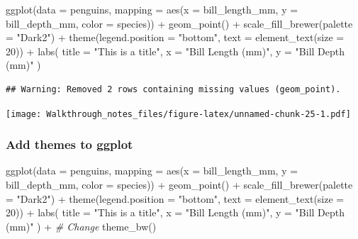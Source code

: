 \documentclass[
]{article}
\newenvironment{Shaded}{\begin{snugshade}}{\end{snugshade}}
\newcommand{\AttributeTok}[1]{\textcolor[rgb]{0.77,0.63,0.00}{#1}}
\newcommand{\CommentTok}[1]{\textcolor[rgb]{0.56,0.35,0.01}{\textit{#1}}}
\newcommand{\DecValTok}[1]{\textcolor[rgb]{0.00,0.00,0.81}{#1}}
\newcommand{\FunctionTok}[1]{\textcolor[rgb]{0.00,0.00,0.00}{#1}}
\newcommand{\NormalTok}[1]{#1}
\newcommand{\SpecialCharTok}[1]{\textcolor[rgb]{0.00,0.00,0.00}{#1}}
\newcommand{\StringTok}[1]{\textcolor[rgb]{0.31,0.60,0.02}{#1}}
\begin{document}
\begin{Shaded}
\begin{Highlighting}[]
\FunctionTok{ggplot}\NormalTok{(}\AttributeTok{data =}\NormalTok{ penguins, }
       \AttributeTok{mapping =} \FunctionTok{aes}\NormalTok{(}\AttributeTok{x =}\NormalTok{ bill\_length\_mm, }
                     \AttributeTok{y =}\NormalTok{ bill\_depth\_mm, }
                     \AttributeTok{color =}\NormalTok{ species)) }\SpecialCharTok{+} 
  \FunctionTok{geom\_point}\NormalTok{() }\SpecialCharTok{+} 
  \FunctionTok{scale\_fill\_brewer}\NormalTok{(}\AttributeTok{palette =} \StringTok{"Dark2"}\NormalTok{) }\SpecialCharTok{+} 
  \FunctionTok{theme}\NormalTok{(}\AttributeTok{legend.position =} \StringTok{"bottom"}\NormalTok{, }
        \AttributeTok{text =} \FunctionTok{element\_text}\NormalTok{(}\AttributeTok{size =} \DecValTok{20}\NormalTok{)) }\SpecialCharTok{+} 
  \FunctionTok{labs}\NormalTok{(}
    \AttributeTok{title =} \StringTok{"This is a title"}\NormalTok{, }
    \AttributeTok{x =} \StringTok{"Bill Length (mm)"}\NormalTok{, }
    \AttributeTok{y =} \StringTok{"Bill Depth (mm)"}
\NormalTok{  )}
\end{Highlighting}
\end{Shaded}

\begin{verbatim}
## Warning: Removed 2 rows containing missing values (geom_point).
\end{verbatim}

\texttt{[image: Walkthrough\_notes\_files/figure-latex/unnamed-chunk-25-1.pdf]}

\hypertarget{add-themes-to-ggplot}{%
\subsubsection{Add themes to ggplot}\label{add-themes-to-ggplot}}

\begin{Shaded}
\begin{Highlighting}[]
\FunctionTok{ggplot}\NormalTok{(}\AttributeTok{data =}\NormalTok{ penguins, }
       \AttributeTok{mapping =} \FunctionTok{aes}\NormalTok{(}\AttributeTok{x =}\NormalTok{ bill\_length\_mm, }
                     \AttributeTok{y =}\NormalTok{ bill\_depth\_mm, }
                     \AttributeTok{color =}\NormalTok{ species)) }\SpecialCharTok{+} 
  \FunctionTok{geom\_point}\NormalTok{() }\SpecialCharTok{+} 
  \FunctionTok{scale\_fill\_brewer}\NormalTok{(}\AttributeTok{palette =} \StringTok{"Dark2"}\NormalTok{) }\SpecialCharTok{+} 
  \FunctionTok{theme}\NormalTok{(}\AttributeTok{legend.position =} \StringTok{"bottom"}\NormalTok{, }
        \AttributeTok{text =} \FunctionTok{element\_text}\NormalTok{(}\AttributeTok{size =} \DecValTok{20}\NormalTok{)) }\SpecialCharTok{+} 
  \FunctionTok{labs}\NormalTok{(}
    \AttributeTok{title =} \StringTok{"This is a title"}\NormalTok{, }
    \AttributeTok{x =} \StringTok{"Bill Length (mm)"}\NormalTok{, }
    \AttributeTok{y =} \StringTok{"Bill Depth (mm)"}
\NormalTok{  ) }\SpecialCharTok{+} 
\CommentTok{\# Change  }
  \FunctionTok{theme\_bw}\NormalTok{()}
\end{Highlighting}
\end{Shaded}
\end{document}
